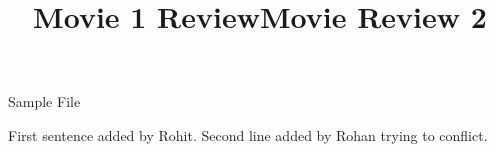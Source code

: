 \documentclass{article}
\begin{document}
\title{Movie 1 Review}


\centerline{\sc \large Sample File}
\vspace{.5pc}
\centerline{\sc }
\vspace{2pc}
\title{Movie Review 2}

First sentence added by Rohit.
Second line added by Rohan trying to conflict.
\end{document}

